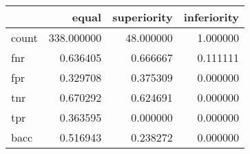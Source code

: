 \begin{tabular}{lrrr}
\toprule
{} &       equal &  superiority &  inferiority \\
\midrule
count &  338.000000 &    48.000000 &     1.000000 \\
fnr   &    0.636405 &     0.666667 &     0.111111 \\
fpr   &    0.329708 &     0.375309 &     0.000000 \\
tnr   &    0.670292 &     0.624691 &     0.000000 \\
tpr   &    0.363595 &     0.000000 &     0.000000 \\
bacc  &    0.516943 &     0.238272 &     0.000000 \\
\bottomrule
\end{tabular}
